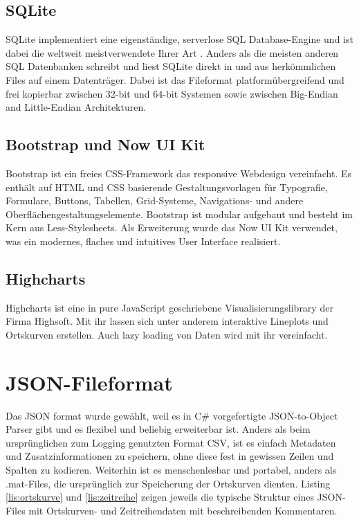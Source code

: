 \subsection{SQLite}

SQLite implementiert eine eigenständige, serverlose SQL Database-Engine und ist dabei die weltweit meistverwendete Ihrer Art \cite{sqlite}. Anders als die meisten anderen SQL Datenbanken schreibt und liest SQLite direkt in und aus herkömmlichen Files auf einem Datenträger. Dabei ist das Fileformat platformübergreifend und frei kopierbar zwischen 32-bit und 64-bit Systemen sowie zwischen Big-Endian and Little-Endian Architekturen.


\subsection{Bootstrap und Now UI Kit}

Bootstrap \cite{bootstrap} ist ein freies CSS-Framework das responsive Webdesign vereinfacht. Es enthält auf HTML und CSS basierende Gestaltungsvorlagen für Typografie, Formulare, Buttons, Tabellen, Grid-Systeme, Navigations- und andere Oberflächengestaltungselemente. Bootstrap ist modular aufgebaut und besteht im Kern aus Less-Stylesheets. Als Erweiterung wurde das Now UI Kit \cite{nowUIkit} verwendet, was ein modernes, flaches und intuitives User Interface realisiert.

\subsection{Highcharts}

Highcharts \cite{highCharts} ist eine in pure JavaScript geschriebene Visualisierungslibrary der Firma Highsoft. Mit ihr lassen sich unter anderem interaktive Lineplots und Ortskurven erstellen. Auch lazy loading von Daten wird mit ihr vereinfacht.

\section{JSON-Fileformat}

Das JSON format wurde gewählt, weil es in C\# vorgefertigte JSON-to-Object Parser gibt und es flexibel und beliebig erweiterbar ist. Anders als beim ursprünglichen zum Logging genutzten Format CSV, ist es einfach Metadaten und Zusatzinformationen zu speichern, ohne diese fest in gewissen Zeilen und Spalten zu kodieren. Weiterhin ist es menschenlesbar und portabel, anders als .mat-Files, die ursprünglich zur Speicherung der Ortskurven dienten. Listing \ref{lis:ortskurve} und \ref{lis:zeitreihe} zeigen jeweils die typische Struktur eines JSON-Files mit Ortskurven- und Zeitreihendaten mit beschreibenden Kommentaren.


